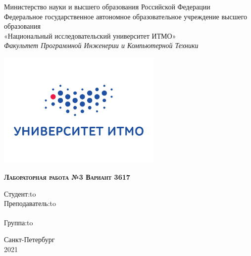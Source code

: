 \Large
\thispagestyle{empty}
\begin{center}
Министерство науки и высшего образования Российской Федерации \\
Федеральное государственное автономное образовательное учреждение высшего образования \\
«Национальный исследовательский университет ИТМО» \\
\vspace{1em}
\textsl{Факультет Программной Инженерии и Компьютерной Техники}\\
\end{center}

\vspace{1em}

\thispagestyle{empty}
\begin{center}
\includegraphics[width=8cm]{imgs/itmo.jpg}
\end{center}

\vspace{3em}

\begin{center}
\large{
\textsc{\textbf{
Лабораторная работа №3 \linebreak 
Вариант 3617}}
}
\end{center}

\vspace{12em}



\newbox{\lbox}
\savebox{\lbox}{\hbox{\studName}}
\newlength{\maxl}
\setlength{\maxl}{\wd\lbox}
\hfill\parbox{11cm}{
\hspace*{5cm}\hspace*{-5cm}Студент:\hfill\hbox to\maxl{\studName\hfill}\\
\hspace*{5cm}\hspace*{-5cm}Преподаватель:\hfill\hbox to\maxl{\teacherName}\\
\\
\hspace*{5cm}\hspace*{-5cm}Группа:\hfill\hbox to\maxl{\groupNumber}\\
}

\vspace{\fill}

\begin{center}
Санкт-Петербург \\2021
\end{center}
\newpage